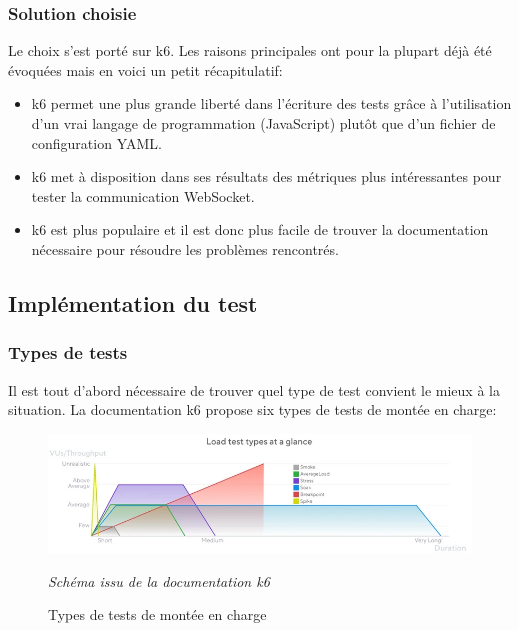 \subsubsection{Solution choisie}

Le choix s'est porté sur k6. Les raisons principales ont pour la plupart déjà été évoquées mais en voici un petit récapitulatif:

\begin{itemize}
  \item k6 permet une plus grande liberté dans l'écriture des tests grâce à l'utilisation d'un vrai langage de programmation (JavaScript) plutôt que d'un fichier de configuration YAML.
  \item k6 met à disposition dans ses résultats des métriques plus intéressantes pour tester la communication WebSocket.
  \item k6 est plus populaire et il est donc plus facile de trouver la documentation nécessaire pour résoudre les problèmes rencontrés.
\end{itemize}

\subsection{Implémentation du test}

\subsubsection{Types de tests}

Il est tout d'abord nécessaire de trouver quel type de test convient le mieux à la situation. La documentation k6 propose six types de tests de montée en charge:

\begin{figure}[H]
  \centering
  \includegraphics[width=1\textwidth]{./assets/figures/load-test-types.png}
  \begin{center}
    \textit{Schéma issu de la documentation k6~\cite{k6-load-test-types}}
  \end{center}
  \caption{Types de tests de montée en charge}
  \label{fig:load-test-types}
\end{figure}

